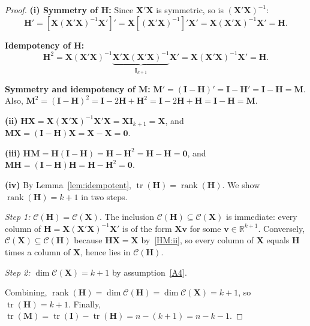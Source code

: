 \documentclass[14pt]{extarticle}
\theoremstyle{plain}
\theoremstyle{definition}
\theoremstyle{remark}
\DeclareMathOperator\tr{tr}
\DeclareMathOperator\rank{rank}
\newcommand{\bX}{\mathbf{X}}
\newcommand{\bI}{\mathbf{I}}
\newcommand{\bH}{\mathbf{H}}
\newcommand{\bM}{\mathbf{M}}
\newcommand{\bzero}{\mathbf{0}}
\newcommand{\bv}{\mathbf{v}}
\newcommand{\Real}{\mathbb{R}}
\newcommand{\calC}{\mathcal{C}}
\begin{document}
\begin{proof}
\textbf{(i) Symmetry of $\bH$:} Since $\bX'\bX$ is symmetric, so is $(\bX'\bX)^{-1}$:
\[
\bH' = [\bX(\bX'\bX)^{-1}\bX']' = \bX[(\bX'\bX)^{-1}]'\bX' = \bX(\bX'\bX)^{-1}\bX' = \bH.
\]

\textbf{Idempotency of $\bH$:}
\[
\bH^2 = \bX(\bX'\bX)^{-1}\underbrace{\bX'\bX(\bX'\bX)^{-1}}_{\bI_{k+1}}\bX' = \bX(\bX'\bX)^{-1}\bX' = \bH.
\]

\textbf{Symmetry and idempotency of $\bM$:} $\bM' = (\bI - \bH)' = \bI - \bH' = \bI - \bH = \bM$. Also, $\bM^2 = (\bI - \bH)^2 = \bI - 2\bH + \bH^2 = \bI - 2\bH + \bH = \bI - \bH = \bM$.

\textbf{(ii)} $\bH\bX = \bX(\bX'\bX)^{-1}\bX'\bX = \bX\bI_{k+1} = \bX$, and $\bM\bX = (\bI - \bH)\bX = \bX - \bX = \bzero$.

\textbf{(iii)} $\bH\bM = \bH(\bI - \bH) = \bH - \bH^2 = \bH - \bH = \bzero$, and $\bM\bH = (\bI - \bH)\bH = \bH - \bH^2 = \bzero$.

\textbf{(iv)} By Lemma~\ref{lem:idempotent}, $\tr(\bH) = \rank(\bH)$. We show $\rank(\bH) = k + 1$ in two steps.

\emph{Step 1:} $\calC(\bH) = \calC(\bX)$. The inclusion $\calC(\bH) \subseteq \calC(\bX)$ is immediate: every column of $\bH = \bX(\bX'\bX)^{-1}\bX'$ is of the form $\bX\bv$ for some $\bv \in \Real^{k+1}$. Conversely, $\calC(\bX) \subseteq \calC(\bH)$ because $\bH\bX = \bX$ by~\ref{HM:ii}, so every column of $\bX$ equals $\bH$ times a column of $\bX$, hence lies in $\calC(\bH)$.

\emph{Step 2:} $\dim\calC(\bX) = k + 1$ by assumption~\ref{A4}.

Combining, $\rank(\bH) = \dim\calC(\bH) = \dim\calC(\bX) = k + 1$, so $\tr(\bH) = k + 1$. Finally, $\tr(\bM) = \tr(\bI) - \tr(\bH) = n - (k + 1) = n - k - 1$.
\end{proof}
\end{document}
